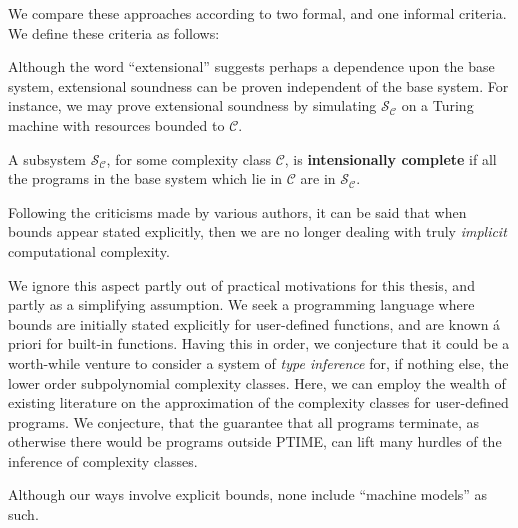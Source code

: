 We compare these approaches according to two formal, and one informal criteria.
We define these criteria as follows:


Although the word ``extensional'' suggests perhaps a dependence upon the base
system, extensional soundness can be proven independent of the base system.
For instance, we may prove extensional soundness by simulating $\mathcal{S_C}$
on a Turing machine with resources bounded to $\mathcal{C}$.

\begin{definition} A subsystem $\mathcal{S_C}$, for some complexity class
$\mathcal{C}$, is \textbf{intensionally complete} if all the programs in the
base system which lie in $\mathcal{C}$ are in $\mathcal{S_C}$. \end{definition}




Following the criticisms made by various authors\cite{bellantoni-cook-1992,
hofmann-2000, dal-lago-hofmann-2010}, it can be said that when bounds appear
stated explicitly, then we are no longer dealing with truly \emph{implicit}
computational complexity.

We ignore this aspect partly out of practical motivations for this thesis, and
partly as a simplifying assumption. We seek a programming language where bounds
are initially stated explicitly for user-defined functions, and are known á
priori for built-in functions. Having this in order, we conjecture that it
could be a worth-while venture to consider a system of \emph{type inference}
for, if nothing else, the lower order subpolynomial complexity classes. Here,
we can employ the wealth of existing literature on the approximation of the
complexity classes for user-defined programs. We conjecture, that the guarantee
that all programs terminate, as otherwise there would be programs outside
PTIME, can lift many hurdles of the inference of complexity classes.

Although our ways involve explicit bounds, none include ``machine models'' as such.




